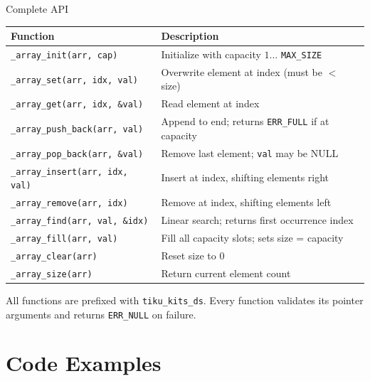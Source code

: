 \documentclass[aspectratio=169, 10pt]{beamer}
\begin{document}
\begin{frame}[fragile]{Complete API}
\begin{table}
\centering
\small
\begin{tabular}{@{}lp{7.5cm}@{}}
\toprule
\textbf{Function} & \textbf{Description} \\
\midrule
\texttt{\_array\_init(arr, cap)}
  & Initialize with capacity $1 \ldots$ \texttt{MAX\_SIZE} \\
\texttt{\_array\_set(arr, idx, val)}
  & Overwrite element at index (must be $<$ size) \\
\texttt{\_array\_get(arr, idx, \&val)}
  & Read element at index \\
\midrule
\texttt{\_array\_push\_back(arr, val)}
  & Append to end; returns \texttt{ERR\_FULL} if at capacity \\
\texttt{\_array\_pop\_back(arr, \&val)}
  & Remove last element; \texttt{val} may be NULL \\
\texttt{\_array\_insert(arr, idx, val)}
  & Insert at index, shifting elements right \\
\texttt{\_array\_remove(arr, idx)}
  & Remove at index, shifting elements left \\
\midrule
\texttt{\_array\_find(arr, val, \&idx)}
  & Linear search; returns first occurrence index \\
\texttt{\_array\_fill(arr, val)}
  & Fill all capacity slots; sets size = capacity \\
\texttt{\_array\_clear(arr)}
  & Reset size to 0 \\
\texttt{\_array\_size(arr)}
  & Return current element count \\
\bottomrule
\end{tabular}
\end{table}

\vspace{0.2em}
{\scriptsize All functions are prefixed with \texttt{tiku\_kits\_ds}.
Every function validates its pointer arguments and returns \texttt{ERR\_NULL} on failure.}
\end{frame}

\section{Code Examples}
\end{document}
